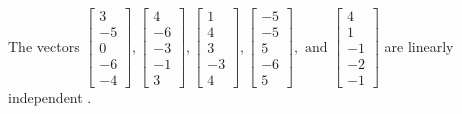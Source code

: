 \begin{exercise}
\begin{exerciseStatement}
  \end{exerciseStatement}
  \begin{exerciseAnswer}
   The vectors \(\left[\begin{array}{r}
3 \\
-5 \\
0 \\
-6 \\
-4
\end{array}\right] , \left[\begin{array}{r}
4 \\
-6 \\
-3 \\
-1 \\
3
\end{array}\right] , \left[\begin{array}{r}
1 \\
4 \\
3 \\
-3 \\
4
\end{array}\right] , \left[\begin{array}{r}
-5 \\
-5 \\
5 \\
-6 \\
5
\end{array}\right] , \text{ and } \left[\begin{array}{r}
4 \\
1 \\
-1 \\
-2 \\
-1
\end{array}\right]\) are 
  	 linearly independent  .
  


  \end{exerciseAnswer}
\end{exercise}
